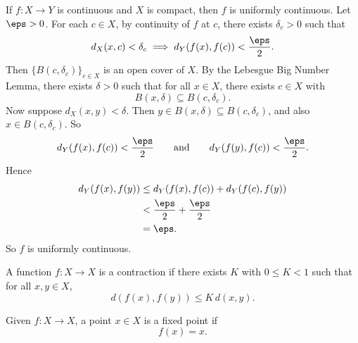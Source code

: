 

\begin{proposition}{
    If $f:X\to Y$ is continuous and $X$ is compact, then $f$ is uniformly continuous.
}
    Let $\eps > 0$.
    For each $c\in X$, by continuity of $f$ at $c$, there exists $\delta_c > 0$ such that
    \[
        d_X(x,c) < \delta_c \implies d_Y(f(x),f(c)) < \frac{\eps}{2}.
    \]
    Then $\{B(c,\delta_c)\}_{c\in X}$ is an open cover of $X$.
    By the Lebesgue Big Number Lemma, there exists $\delta > 0$ such that for all $x\in X$, there exists $c\in X$ with
    \[
        B(x,\delta)\subseteq B(c,\delta_c).
    \]
    Now suppose $d_X(x,y) < \delta$.
    Then $y\in B(x,\delta)\subseteq B(c,\delta_c)$, and also $x\in B(c,\delta_c)$.
    So
    \[
        d_Y(f(x),f(c)) < \frac{\eps}{2}
        \qquad\text{and}\qquad
        d_Y(f(y),f(c)) < \frac{\eps}{2}.
    \]
    Hence
    \begin{align*}
        d_Y(f(x),f(y))
        &\leq d_Y(f(x),f(c)) + d_Y(f(c),f(y))\\
        &< \frac{\eps}{2} + \frac{\eps}{2}\\
        &= \eps.
    \end{align*}
    So $f$ is uniformly continuous.
\end{proposition}

\begin{definition}[Contraction]
    A function $f:X\to X$ is a contraction if there exists $K$ with $0\leq K < 1$ such that for all $x,y\in X$,
    \[
        d(f(x),f(y)) \leq K\,d(x,y).
    \]
\end{definition}

\begin{definition}
    Given $f:X\to X$, a point $x\in X$ is a fixed point if
    \[
        f(x) = x.
    \]
\end{definition}

